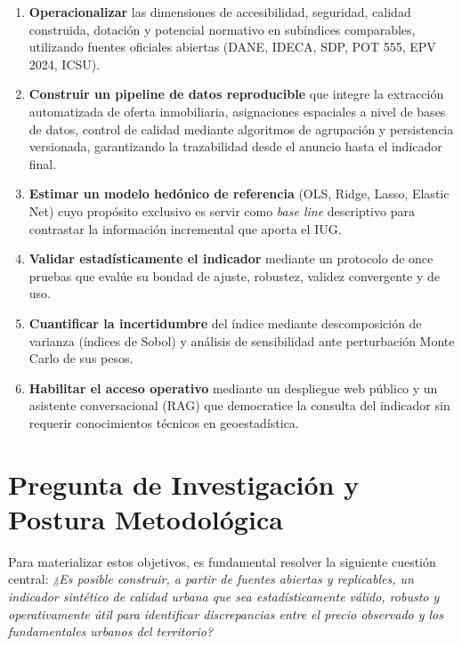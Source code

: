 \documentclass[12pt, a4paper, twoside, openright]{report}
\theoremstyle{plain}
\theoremstyle{definition}
\newcommand{\IUG}{IUG}             %
\begin{document}
\begin{enumerate}
    \item \textbf{Operacionalizar} las dimensiones de accesibilidad, seguridad, calidad construida, dotación y potencial normativo en subíndices comparables, utilizando fuentes oficiales abiertas (DANE, IDECA, SDP, POT 555, EPV 2024, ICSU).
    
    \item \textbf{Construir un pipeline de datos reproducible} que integre la extracción automatizada de oferta inmobiliaria, asignaciones espaciales a nivel de bases de datos, control de calidad mediante algoritmos de agrupación y persistencia versionada, garantizando la trazabilidad desde el anuncio hasta el indicador final.
    
    \item \textbf{Estimar un modelo hedónico de referencia} (OLS, Ridge, Lasso, Elastic Net) cuyo propósito exclusivo es servir como \emph{base line} descriptivo para contrastar la información incremental que aporta el \IUG{}.
    
    \item \textbf{Validar estadísticamente el indicador} mediante un protocolo de once pruebas que evalúe su bondad de ajuste, robustez, validez convergente y de uso.
    
    \item \textbf{Cuantificar la incertidumbre} del índice mediante descomposición de varianza (índices de Sobol) y análisis de sensibilidad ante perturbación Monte Carlo de sus pesos.
    
    \item \textbf{Habilitar el acceso operativo} mediante un despliegue web público y un asistente conversacional (RAG) que democratice la consulta del indicador sin requerir conocimientos técnicos en geoestadística.
\end{enumerate}

\section{Pregunta de Investigación y Postura Metodológica}

Para materializar estos objetivos, es fundamental resolver la siguiente cuestión central: \textit{¿Es posible construir, a partir de fuentes abiertas y replicables, un indicador sintético de calidad urbana que sea estadísticamente válido, robusto y operativamente útil para identificar discrepancias entre el precio observado y los fundamentales urbanos del territorio?}
\end{document}
